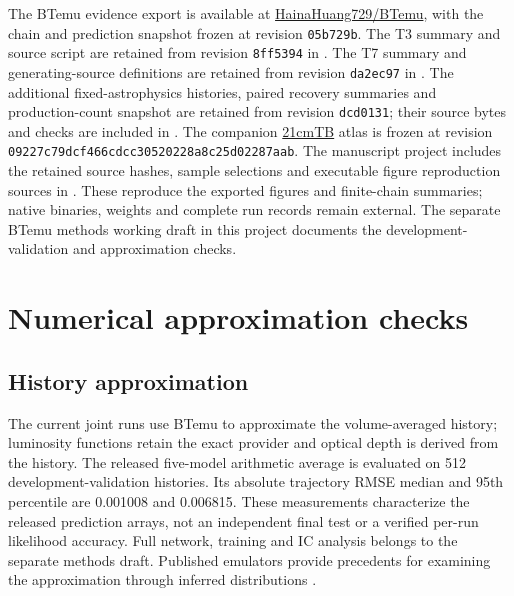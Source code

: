 The BTemu evidence export is available at \href{https://github.com/HainaHuang729/BTemu}{HainaHuang729/BTemu}, with the chain and prediction snapshot frozen at revision \texttt{05b729b}. The T3 summary and source script are retained from revision \texttt{8ff5394} in . The T7 summary and generating-source definitions are retained from revision \texttt{da2ec97} in . The additional fixed-astrophysics histories, paired recovery summaries and production-count snapshot are retained from revision \texttt{dcd0131}; their source bytes and checks are included in . The companion \href{https://github.com/HainaHuang729/21cmTB}{21cmTB} atlas is frozen at revision \texttt{09227c79dcf466cdcc30520228a8c25d02287aab}. The manuscript project includes the retained source hashes, sample selections and executable figure reproduction sources in . These reproduce the exported figures and finite-chain summaries; native binaries, weights and complete run records remain external. The separate BTemu methods working draft in this project documents the development-validation and approximation checks.


\clearpage


\clearpage\appendix
\setcounter{figure}{0}

\section{Numerical approximation checks}\label{app:approximation}

\subsection{History approximation}\label{reported-history-accuracy}

The current joint runs use BTemu to approximate the volume-averaged history; luminosity functions retain the exact provider and optical depth is derived from the history. The released five-model arithmetic average is evaluated on 512 development-validation histories. Its absolute trajectory RMSE median and 95th percentile are 0.001008 and 0.006815. These measurements characterize the released prediction arrays, not an independent final test or a verified per-run likelihood accuracy. Full network, training and IC analysis belongs to the separate methods draft. Published emulators provide precedents for examining the approximation through inferred distributions \cite{Breitman2024,Breitman2026}.

